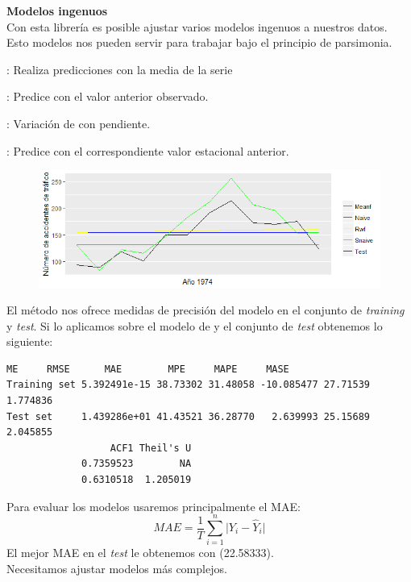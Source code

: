 \documentclass[10pt,a4paper,twoside]{beamer}
\begin{document}
\begin{frame}
\textbf{Modelos ingenuos}\\
Con esta librería es posible ajustar varios modelos ingenuos a nuestros datos. Esto modelos nos pueden servir para trabajar bajo el principio de parsimonia.\\

\begin{itemize*}
\item {}: Realiza predicciones con la media de la serie
\item {}: Predice con el valor anterior observado.
\item {}: Variación de  con pendiente.
\item {}: Predice con el correspondiente valor estacional anterior.
\end{itemize*}

\vspace{0.5cm}

\begin{figure}
    \centering
    \centerline{\includegraphics[scale = 0.5]{Images/311.png}}
    \label{comp}
\end{figure}

\end{frame}


\begin{frame}[fragile]
El método  nos ofrece medidas de precisión del modelo en el conjunto de \textit{training} y \textit{test}. Si lo aplicamos sobre el modelo de  y el conjunto de \textit{test}  obtenemos lo siguiente:

\begin{Verbatim}[fontsize=\footnotesize]
                       ME     RMSE      MAE        MPE     MAPE     MASE
Training set 5.392491e-15 38.73302 31.48058 -10.085477 27.71539 1.774836
Test set     1.439286e+01 41.43521 36.28770   2.639993 25.15689 2.045855
                  ACF1 Theil's U
             0.7359523        NA
             0.6310518  1.205019
\end{Verbatim}

Para evaluar los modelos usaremos principalmente el MAE:
\begin{equation*}
    MAE = \frac{1}{T} \sum_{i = 1}^{n} \lvert Y_i - \widehat{Y}_i \lvert
\end{equation*}
El mejor MAE en el \textit{test} le obtenemos con  (22.58333).\\
Necesitamos ajustar modelos más complejos.

\end{frame}
\end{document}
